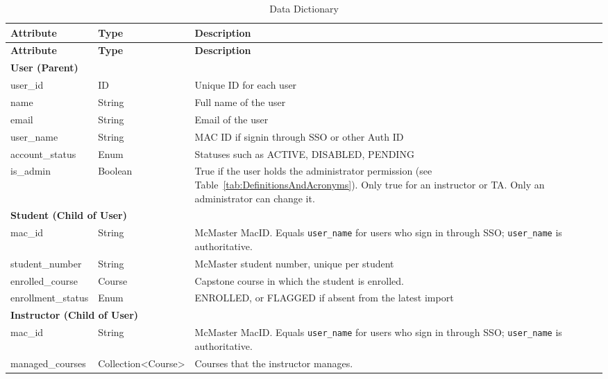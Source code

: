 \documentclass[12pt]{article}
\begin{document}
  \begin{longtable}{|
      p{}|
      p{}|
      p{}|
  }
      \caption{Data Dictionary}
      \label{tab:DataDictionary}\\
      \hline

      \textbf{Attribute} & \textbf{Type} & \textbf{Description}\\ \hline \endfirsthead \hline 
      \textbf{Attribute} & \textbf{Type} & \textbf{Description}\\ \hline \endhead

      \multicolumn{3}{|l|}{\textbf{User (Parent)}}\\ \hline
      user\_id & ID & Unique ID for each user \\ \hline
      name & String & Full name of the user \\ \hline
      email & String & Email of the user \\ \hline
      user\_name & String & MAC ID if signin through SSO or other Auth ID \\ \hline
      account\_status & Enum & Statuses such as ACTIVE, DISABLED, PENDING \\ \hline
      is\_admin & Boolean & True if the user holds the administrator permission (see Table~\ref{tab:DefinitionsAndAcronyms}). Only true for an instructor or TA. Only an administrator can change it. \\ \hline

      \multicolumn{3}{|l|}{\textbf{Student (Child of User)}}\\ \hline
      mac\_id & String & McMaster MacID. Equals \texttt{user\_name} for users who sign in through SSO; \texttt{user\_name} is authoritative. \\ \hline
      student\_number & String & McMaster student number, unique per student \\ \hline
      enrolled\_course & Course & Capstone course in which the student is enrolled. \\ \hline
      enrollment\_status & Enum & ENROLLED, or FLAGGED if absent from the latest import \\ \hline

      \multicolumn{3}{|l|}{\textbf{Instructor (Child of User)}}\\ \hline
      mac\_id & String & McMaster MacID. Equals \texttt{user\_name} for users who sign in through SSO; \texttt{user\_name} is authoritative. \\ \hline
      managed\_courses & Collection\textless Course\textgreater & Courses that the instructor manages. \\ \hline


\end{longtable}
\end{document}
